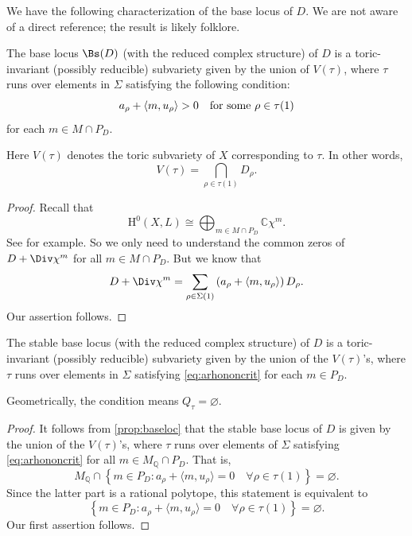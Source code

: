 We have the following characterization of the base locus of $D$. We are not aware of a direct reference; the result is likely folklore.
\begin{proposition}\label{prop:baseloc}
    The base locus $\Bs(D)$ (with the reduced complex structure) of $D$ is a toric-invariant (possibly reducible) subvariety given by the union of $V(\tau)$, where $\tau$ runs over elements in $\Sigma$ satisfying the following condition:
    \begin{equation}\label{eq:arhononcrit}
        a_{\rho}+\langle m, u_{\rho}\rangle>0\quad \textup{for some }\rho\in \tau(1)
    \end{equation}
    for each $m\in M\cap P_D$.
\end{proposition}
Here $V(\tau)$ denotes the toric subvariety of $X$ corresponding to $\tau$. In other words,
\[
V(\tau)=\bigcap_{\rho\in \tau(1)} D_{\rho}.
\]
\begin{proof}
    Recall that
    \[
    \mathrm{H}^0(X,L)\cong \bigoplus_{m\in M\cap P_D} \mathbb{C}\chi^m.
    \]
    See \cite[Proposition~4.3.3]{CLS11} for example. So we only need to understand the common zeros of $D+\Div \chi^m$ for all $m\in M\cap P_D$. But we know that
    \[
    D+\Div \chi^m=\sum_{\rho\in \Sigma(1)} \left( a_{\rho}+\langle m, u_{\rho}\rangle \right) D_{\rho}.
    \]
    Our assertion follows.
\end{proof}

\begin{corollary}\label{cor:stablebl_toric}
    The stable base locus (with the reduced complex structure) of $D$ is a toric-invariant (possibly reducible) subvariety given by the union of the $V(\tau)$'s,  where $\tau$ runs over elements in $\Sigma$ satisfying \eqref{eq:arhononcrit} for each $m\in P_D$.
\end{corollary}
Geometrically, the condition means $Q_{\tau}=\varnothing$.
\begin{proof}
    It follows from \cref{prop:baseloc} that the stable base locus of $D$ is given by the union of the $V(\tau)$'s, where $\tau$ runs over elements of $\Sigma$ satisfying \eqref{eq:arhononcrit} for all $m\in M_{\mathbb{Q}}\cap P_D$. That is,
    \[
        M_{\mathbb{Q}}\cap \left\{ m\in P_D : a_{\rho}+\langle m, u_{\rho}\rangle=0\quad \forall \rho\in \tau(1) \right\}=\varnothing.
    \]
    Since the latter part is a rational polytope, this statement is equivalent to
    \begin{equation}\label{eq:PDcapvarnot}
    \left\{ m\in P_D : a_{\rho}+\langle m, u_{\rho}\rangle=0\quad \forall \rho\in \tau(1) \right\}=\varnothing.
    \end{equation}
    Our first assertion follows.
\end{proof}


